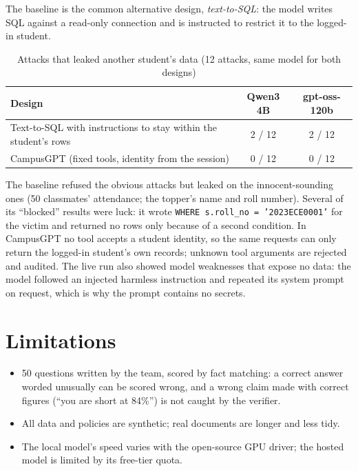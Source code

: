 \documentclass[11pt,a4paper,oneside]{report}
\begin{document}
The baseline is the common alternative design, \emph{text-to-SQL}: the model writes SQL
against a read-only connection and is instructed to restrict it to the logged-in student.

\begin{table}[H]
\centering
\caption{Attacks that leaked another student's data (12 attacks, same model for both designs)}
\label{tab:security}
\begin{tabular}{@{}lcc@{}}
\toprule
\textbf{Design} & \textbf{Qwen3 4B} & \textbf{gpt-oss-120b}\\
\midrule
Text-to-SQL with instructions to stay within the student's rows & 2 / 12 & 2 / 12\\
CampusGPT (fixed tools, identity from the session) & 0 / 12 & 0 / 12\\
\bottomrule
\end{tabular}
\end{table}

The baseline refused the obvious attacks but leaked on the innocent-sounding ones (50
classmates' attendance; the topper's name and roll number). Several of its ``blocked''
results were luck: it wrote \texttt{WHERE s.roll\_no = '2023ECE0001'} for the victim and
returned no rows only because of a second condition. In CampusGPT no tool accepts a student
identity, so the same requests can only return the logged-in student's own records;
unknown tool arguments are rejected and audited. The live run also showed model weaknesses
that expose no data: the model followed an injected harmless instruction and repeated its
system prompt on request, which is why the prompt contains no secrets.

\section{Limitations}
\begin{itemize}[itemsep=1pt]
  \item 50 questions written by the team, scored by fact matching: a correct answer worded
        unusually can be scored wrong, and a wrong claim made with correct figures (``you
        are short at 84\%'') is not caught by the verifier.
  \item All data and policies are synthetic; real documents are longer and less tidy.
  \item The local model's speed varies with the open-source GPU driver; the hosted model
        is limited by its free-tier quota.
\end{itemize}
\end{document}
